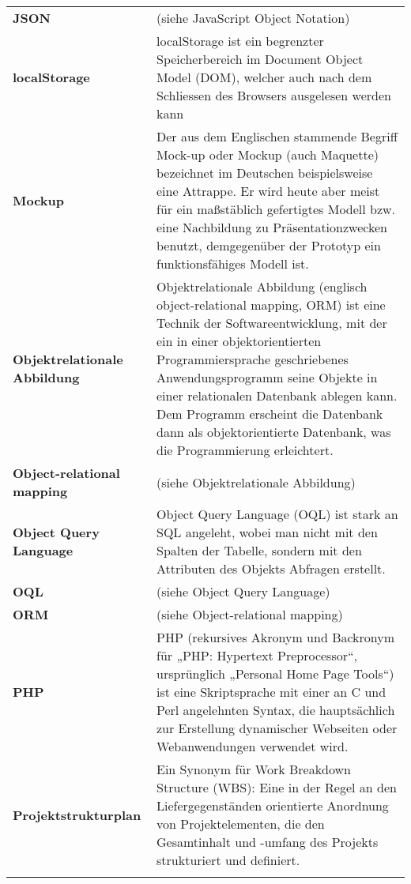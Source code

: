 \begin{longtable}{>{\raggedright}m{3cm}m{11cm}}
	\textbf{JSON}&
	(siehe JavaScript Object Notation)\\ \addlinespace

	\textbf{localStorage}&
	localStorage ist ein begrenzter Speicherbereich im Document Object Model (DOM), welcher auch nach dem Schliessen des Browsers ausgelesen werden kann\\ \addlinespace

	\textbf{Mockup}&
	Der aus dem Englischen stammende Begriff Mock-up oder Mockup (auch Maquette) bezeichnet im Deutschen beispielsweise eine Attrappe. Er wird heute aber meist für ein maßstäblich gefertigtes Modell bzw. eine Nachbildung zu Präsentationzwecken benutzt, demgegenüber der Prototyp ein funktionsfähiges Modell ist.\cite{wiki_mockup}\\ \addlinespace

	\textbf{Objektrelationale Abbildung}&
	Objektrelationale Abbildung (englisch object-relational mapping, ORM) ist eine Technik der Softwareentwicklung, mit der ein in einer objektorientierten Programmiersprache geschriebenes Anwendungsprogramm seine Objekte in einer relationalen Datenbank ablegen kann. Dem Programm erscheint die Datenbank dann als objektorientierte Datenbank, was die Programmierung erleichtert. \cite{wiki_orm}\\ \addlinespace

	\textbf{Object-relational mapping}&
	(siehe Objektrelationale Abbildung)\\ \addlinespace

	\textbf{Object Query Language}&
	Object Query Language (OQL) ist stark an SQL angeleht, wobei man nicht mit den Spalten der Tabelle, sondern mit den Attributen des Objekts Abfragen erstellt.\\ \addlinespace

	\textbf{OQL}&
	(siehe Object Query Language)\\ \addlinespace

	\textbf{ORM}&
	(siehe Object-relational mapping)\\ \addlinespace

	\textbf{PHP}&
	PHP (rekursives Akronym und Backronym für „PHP: Hypertext Preprocessor“, ursprünglich „Personal Home Page Tools“) ist eine Skriptsprache mit einer an C und Perl angelehnten Syntax, die hauptsächlich zur Erstellung dynamischer Webseiten oder Webanwendungen verwendet wird.\cite{wiki_php}\\ \addlinespace

	\textbf{Projektstrukturplan}&
	Ein Synonym für Work Breakdown Structure (WBS): Eine in der Regel an den Liefergegenständen orientierte Anordnung von Projektelementen, die den Gesamtinhalt und -umfang des Projekts strukturiert und definiert.\cite{proj_mgmt_book}\\ \addlinespace


\end{longtable}
